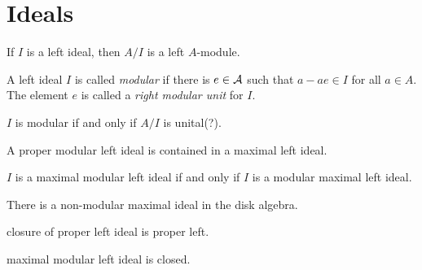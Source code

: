 \documentclass{../../large}
\begin{document}
\section{Ideals}
\begin{prb}[Ideals]
\begin{parts}
\item If $I$ is a left ideal, then $A/I$ is a left $A$-module.
\end{parts}
\end{prb}

\begin{prb}
A left ideal $I$ is called \emph{modular} if there is $e\in\mathcal{A}$ such that $a-ae\in I$ for all $a\in A$.
The element $e$ is called a \emph{right modular unit} for $I$.
\begin{parts}
\item $I$ is modular if and only if $A/I$ is unital(?).
\item A proper modular left ideal is contained in a maximal left ideal.
\item $I$ is a maximal modular left ideal if and only if $I$ is a modular maximal left ideal.
\item There is a non-modular maximal ideal in the disk algebra.
\end{parts}
\end{prb}

\begin{prb}
\begin{parts}
\item closure of proper left ideal is proper left.
\item maximal modular left ideal is closed.
\end{parts}
\end{prb}
\end{document}
